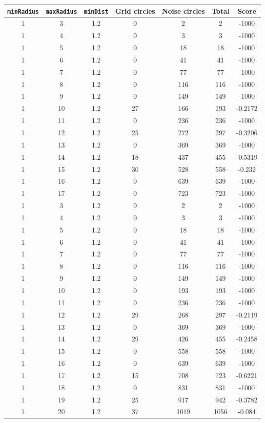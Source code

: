 \documentclass[letterpaper, 12pt]{article}
\begin{document}
\begin{longtable}{|c|c|c|c|c|c|c|}
\hline
\textbf{\texttt{minRadius}} & \textbf{\texttt{maxRadius}} & \textbf{\texttt{minDist}} & \textbf{Grid circles} & \textbf{Noise circles} & \textbf{Total} & \textbf{Score} \\
\hline
1 & 3 & 1.2 & 0 & 2 & 2 & -1000 \\
\hline
1 & 4 & 1.2 & 0 & 3 & 3 & -1000 \\
\hline
1 & 5 & 1.2 & 0 & 18 & 18 & -1000 \\
\hline
1 & 6 & 1.2 & 0 & 41 & 41 & -1000 \\
\hline
1 & 7 & 1.2 & 0 & 77 & 77 & -1000 \\
\hline
1 & 8 & 1.2 & 0 & 116 & 116 & -1000 \\
\hline
1 & 9 & 1.2 & 0 & 149 & 149 & -1000 \\
\hline
1 & 10 & 1.2 & 27 & 166 & 193 & -0.2172 \\
\hline
1 & 11 & 1.2 & 0 & 236 & 236 & -1000 \\
\hline
1 & 12 & 1.2 & 25 & 272 & 297 & -0.3206 \\
\hline
1 & 13 & 1.2 & 0 & 369 & 369 & -1000 \\
\hline
1 & 14 & 1.2 & 18 & 437 & 455 & -0.5319 \\
\hline
1 & 15 & 1.2 & 30 & 528 & 558 & -0.232 \\
\hline
1 & 16 & 1.2 & 0 & 639 & 639 & -1000 \\
\hline
1 & 17 & 1.2 & 0 & 723 & 723 & -1000 \\
\hline
1 & 3 & 1.2 & 0 & 2 & 2 & -1000 \\
\hline
1 & 4 & 1.2 & 0 & 3 & 3 & -1000 \\
\hline
1 & 5 & 1.2 & 0 & 18 & 18 & -1000 \\
\hline
1 & 6 & 1.2 & 0 & 41 & 41 & -1000 \\
\hline
1 & 7 & 1.2 & 0 & 77 & 77 & -1000 \\
\hline
1 & 8 & 1.2 & 0 & 116 & 116 & -1000 \\
\hline
1 & 9 & 1.2 & 0 & 149 & 149 & -1000 \\
\hline
1 & 10 & 1.2 & 0 & 193 & 193 & -1000 \\
\hline
1 & 11 & 1.2 & 0 & 236 & 236 & -1000 \\
\hline
1 & 12 & 1.2 & 29 & 268 & 297 & -0.2119 \\
\hline
1 & 13 & 1.2 & 0 & 369 & 369 & -1000 \\
\hline
1 & 14 & 1.2 & 29 & 426 & 455 & -0.2458 \\
\hline
1 & 15 & 1.2 & 0 & 558 & 558 & -1000 \\
\hline
1 & 16 & 1.2 & 0 & 639 & 639 & -1000 \\
\hline
1 & 17 & 1.2 & 15 & 708 & 723 & -0.6221 \\
\hline
1 & 18 & 1.2 & 0 & 831 & 831 & -1000 \\
\hline
1 & 19 & 1.2 & 25 & 917 & 942 & -0.3782 \\
\hline
1 & 20 & 1.2 & 37 & 1019 & 1056 & -0.084 \\
\hline
\end{longtable}
\end{document}
